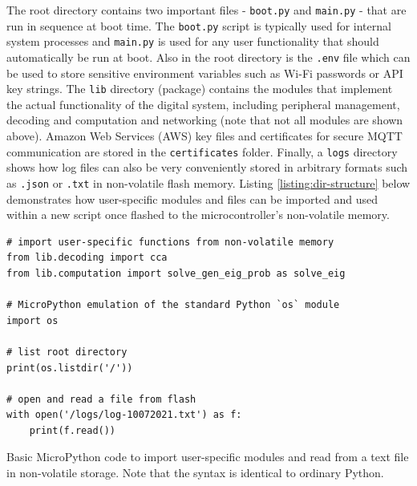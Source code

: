 The root directory contains two important files - \texttt{boot.py} and \texttt{main.py} - that are run in sequence at boot time. The \texttt{boot.py} script is typically used for internal system processes and \texttt{main.py} is used for any user functionality that should automatically be run at boot. Also in the root directory is the \texttt{.env} file which can be used to store sensitive environment variables such as Wi-Fi passwords or API key strings. The \texttt{lib} directory (package) contains the modules that implement the actual functionality of the digital system, including peripheral management, decoding and computation and networking (note that not all modules are shown above). Amazon Web Services (AWS) key files and certificates for secure MQTT communication are stored in the \texttt{certificates} folder. Finally, a \texttt{logs} directory shows how log files can also be very conveniently stored in arbitrary formats such as \texttt{.json} or \texttt{.txt} in non-volatile flash memory. Listing \ref{listing:dir-structure} below demonstrates how user-specific modules and files can be imported and used within a new script once flashed to the microcontroller's non-volatile memory. 

\begin{listing}[h]
\begin{verbatim}
# import user-specific functions from non-volatile memory
from lib.decoding import cca
from lib.computation import solve_gen_eig_prob as solve_eig

# MicroPython emulation of the standard Python `os` module
import os

# list root directory
print(os.listdir('/'))

# open and read a file from flash
with open('/logs/log-10072021.txt') as f:
    print(f.read())
\end{verbatim}
\caption[Basic MicroPython code to import user-specific modules and read from a text file in non-volatile storage.]{Basic MicroPython code to import user-specific modules and read from a text file in non-volatile storage. Note that the syntax is identical to ordinary Python.}
\label{listing:dir-structure}
\end{listing}

